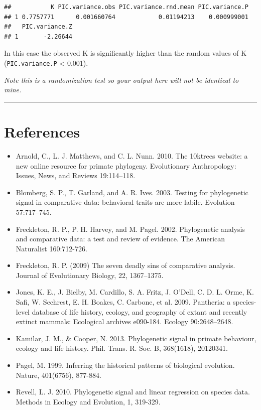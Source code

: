 \documentclass[]{book}
\providecommand{\tightlist}{%
  \setlength{\itemsep}{0pt}\setlength{\parskip}{0pt}}
\begin{document}
\begin{verbatim}
##           K PIC.variance.obs PIC.variance.rnd.mean PIC.variance.P
## 1 0.7757771      0.001660764            0.01194213    0.000999001
##   PIC.variance.Z
## 1       -2.26644
\end{verbatim}

In this case the observed K is significantly higher than the random
values of K (\texttt{PIC.variance.P} \textless{} 0.001).

\emph{Note this is a randomization test so your output here will not be
identical to mine.}

\begin{center}\rule{0.5\linewidth}{\linethickness}\end{center}

\section{References}\label{references-1}

\begin{itemize}
\tightlist
\item
  Arnold, C., L. J. Matthews, and C. L. Nunn. 2010. The 10ktrees
  website: a new online resource for primate phylogeny. Evolutionary
  Anthropology: Issues, News, and Reviews 19:114--118.
\item
  Blomberg, S. P., T. Garland, and A. R. Ives. 2003. Testing for
  phylogenetic signal in comparative data: behavioral traits are more
  labile. Evolution 57:717--745.
\item
  Freckleton, R. P., P. H. Harvey, and M. Pagel. 2002. Phylogenetic
  analysis and comparative data: a test and review of evidence. The
  American Naturalist 160:712-726.
\item
  Freckleton, R. P. (2009) The seven deadly sins of comparative
  analysis. Journal of Evolutionary Biology, 22, 1367--1375.
\item
  Jones, K. E., J. Bielby, M. Cardillo, S. A. Fritz, J. O'Dell, C. D. L.
  Orme, K. Safi, W. Sechrest, E. H. Boakes, C. Carbone, et al. 2009.
  Pantheria: a species-level database of life history, ecology, and
  geography of extant and recently extinct mammals: Ecological archives
  e090-184. Ecology 90:2648--2648.
\item
  Kamilar, J. M., \& Cooper, N. 2013. Phylogenetic signal in primate
  behaviour, ecology and life history. Phil. Trans. R. Soc. B,
  368(1618), 20120341.
\item
  Pagel, M. 1999. Inferring the historical patterns of biological
  evolution. Nature, 401(6756), 877-884.
\item
  Revell, L. J. 2010. Phylogenetic signal and linear regression on
  species data. Methods in Ecology and Evolution, 1, 319-329.
\end{itemize}
\end{document}
